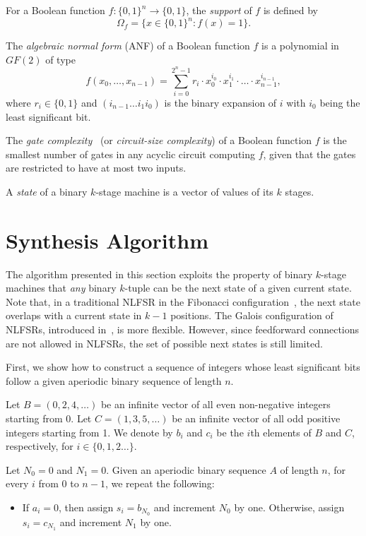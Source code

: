 \documentclass[twocolumn]{IEEEtran} \usepackage{epsfig}
\begin{document}
For a Boolean function $f: \{0,1\}^n \rightarrow \{0,1\}$, the {\em support} of $f$ is defined by 
\[
\Omega_{f} = \{x \in \{0,1\}^n: f(x) = 1\}.
\]

The {\em algebraic normal form} (ANF) of a Boolean function $f$ is a polynomial in $GF(2)$ of type
\[
f(x_0, \ldots, x_{n-1}) = \sum_{i=0}^{2^n-1}  r_i \cdot 
x_0^{i_0} \cdot x_1^{i_1} \cdot \ldots \cdot x_{n-1}^{i_{n-1}},
\]
where $r_i \in \{0,1\}$ and $(i_{n-1} \ldots  i_1 i_0)$ is the binary
expansion of $i$ with $i_0$ being the least significant bit. 

The {\em gate complexity}~\cite{massey_talk}  (or {\em circuit-size complexity}) of a Boolean function $f$ is the smallest 
number of gates in any acyclic circuit computing $f$, given that the 
gates are restricted to have at most two inputs.

A {\em state} of a binary $k$-stage machine is a vector of values of its $k$ stages.

\section{Synthesis Algorithm} \label{syn_alg}

The algorithm presented in this section exploits the property of binary
$k$-stage machines that {\em  any} binary $k$-tuple can be the next state of 
a given current state. Note that, in a traditional NLFSR in the Fibonacci configuration~\cite{Golomb_book}, the next state
overlaps with a current state in $k-1$ positions.
The Galois configuration of NLFSRs, introduced in~\cite{Du09j}, is more flexible.
However, since feedforward connections are not allowed in NLFSRs,
the set of possible next states is still limited.

First, we show how to construct a sequence of integers 
whose least significant bits follow a given aperiodic binary sequence of length $n$.


Let $B = (0,2,4,\ldots)$ be an infinite vector of all even non-negative integers starting from 0.  
Let $C = (1,3,5,\ldots)$ be an infinite vector of all odd positive integers starting from 1.  
We denote by $b_i$ and $c_i$ be the $i$th elements of $B$ and $C$, respectively,
for $i \in \{0,1,2\ldots\}$.

Let $N_0 = 0$ and $N_1 = 0$.  Given an aperiodic binary sequence $A$ of length $n$, for every $i$ from 0 to $n-1$, we repeat the following: 

\begin{itemize}
\item[]
If $a_i = 0$, then assign $s_i = b_{N_0}$ 
and increment $N_0$ by one. Otherwise, assign $s_i =  c_{N_1}$ 
and increment $N_1$ by one. 
\end{itemize}
\end{document}
